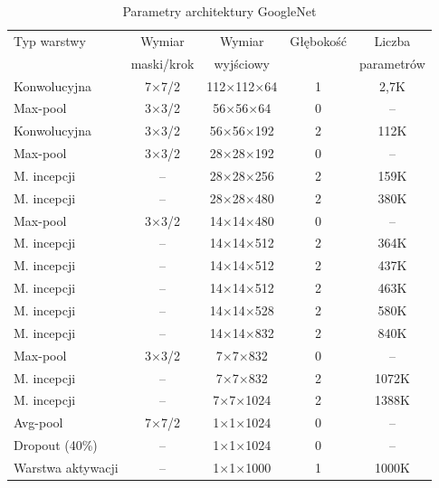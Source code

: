 \begin{table}[h!]
	\setlength{\tabcolsep}{14pt}
	\centering
	\caption{Parametry architektury GoogleNet}
	\scriptsize
	\label{tab:USG-params}
	\begin{tabular}{l | c | c | c | c }
		Typ warstwy  & Wymiar  & Wymiar & Głębokość & Liczba   \\  
		& maski/krok & wyjściowy &&parametrów\\
	    \hline \hline
		Konwolucyjna   & 7$\times$7/2 & 112$\times$112$\times$64 & 1 & 2,7K \\ \hline
		Max-pool & 3$\times$3/2 & 56$\times$56$\times$64 & 0 & --  \\ \hline
		Konwolucyjna & 3$\times$3/2 & 56$\times$56$\times$192 & 2 & 112K  \\ \hline
		Max-pool & 3$\times$3/2 & 28$\times$28$\times$192 & 0 & --  \\ \hline
		M. incepcji & -- & 28$\times$28$\times$256 & 2 & 159K  \\ \hline
		M. incepcji & -- & 28$\times$28$\times$480 & 2 & 380K  \\ \hline
		Max-pool & 3$\times$3/2 & 14$\times$14$\times$480 & 0 & --  \\ \hline
		M. incepcji & -- & 14$\times$14$\times$512 & 2 & 364K  \\ \hline
		M. incepcji & -- & 14$\times$14$\times$512 & 2 & 437K  \\ \hline
		M. incepcji & -- & 14$\times$14$\times$512 & 2 & 463K  \\ \hline
		M. incepcji & -- & 14$\times$14$\times$528 & 2 & 580K  \\ \hline
		M. incepcji & -- & 14$\times$14$\times$832 & 2 & 840K  \\ \hline
		Max-pool & 3$\times$3/2 & 7$\times$7$\times$832 & 0 & --  \\ \hline
		M. incepcji & -- & 7$\times$7$\times$832 & 2 & 1072K  \\ \hline
		M. incepcji & -- & 7$\times$7$\times$1024 & 2 & 1388K  \\ \hline
		Avg-pool & 7$\times$7/2 & 1$\times$1$\times$1024 & 0 & --  \\ \hline
		Dropout (40\%) & -- & 1$\times$1$\times$1024 & 0 & --  \\ \hline
		Warstwa aktywacji & -- & 1$\times$1$\times$1000 & 1 & 1000K  \\ \hline
	\end{tabular}
	\label{GoogleNetParams}
\end{table}
\renewcommand{\arraystretch}{1}

